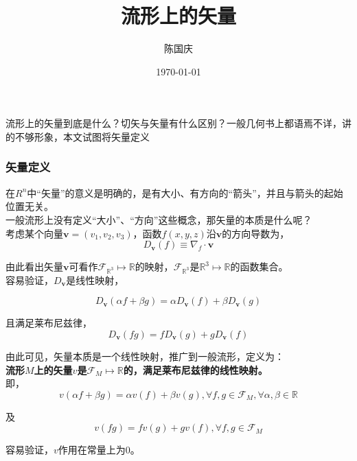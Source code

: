 \documentclass[hpyerref,UTF8,a4paper,titlepage,12pt,oneside]{ctexbook}
\title{流形上的矢量}
\author{陈国庆}
\date{\today}
\theoremstyle{definition}
\begin{document}
\maketitle

流形上的矢量到底是什么？切矢与矢量有什么区别？一般几何书上都语焉不详，讲的不够形象，本文试图将矢量定义

\subsubsection*{矢量定义}

在$R^n$中“矢量”的意义是明确的，是有大小、有方向的“箭头”，并且与箭头的起始位置无关。\\

一般流形上没有定义“大小”、“方向”这些概念，那矢量的本质是什么呢？\\

考虑某个向量$\mathbf{v} = (v_1,v_2,v_3)$，函数$f(x,y,z)$沿$\mathbf{v}$的方向导数为，
$$
	D_\mathbf{v}(f) \equiv\nabla_f \cdot \mathbf{v}
$$

由此看出矢量$\mathbf{v}$可看作$\mathscr{F}_{\mathbb{R}^3} \mapsto \mathbb{R} $的映射，$\mathscr{F}_{\mathbb{R}^3}$是$\mathbb{R}^3\mapsto \mathbb{R}$的函数集合。\\

容易验证，$D_\mathbf{v}$是线性映射，

$$
	D_\mathbf{v}(\alpha f+ \beta g) = \alpha D_\mathbf{v}(f) + \beta D_\mathbf{v}(g)
$$

且满足莱布尼兹律，
$$
	D_\mathbf{v}(fg) = fD_\mathbf{v}(g) + gD_\mathbf{v}(f)
$$

由此可见，矢量本质是一个线性映射，推广到一般流形，定义为：\\

\textbf{流形$M$上的矢量$v$是$\mathscr{F}_M \mapsto \mathbb{R} $的，满足莱布尼兹律的线性映射。}\\

即，
\begin{equation} \label{v_linear}
	v(\alpha f+ \beta g) = \alpha v(f) + \beta v(g),\forall f,g \in \mathscr{F}_M,\forall \alpha,\beta \in \mathbb{R}
\end{equation}

及
\begin{equation} \label{v_leb}
	v(fg) = fv(g) + gv(f),\forall f,g \in \mathscr{F}_M
\end{equation}

容易验证，$v$作用在常量上为$0$。\\
\end{document}
